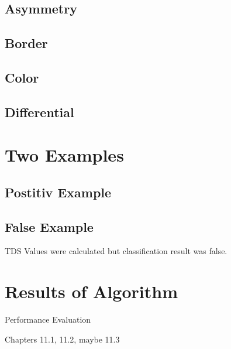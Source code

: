 \subsection{Asymmetry}


\subsection{Border}


\subsection{Color}


\subsection{Differential}

\section{Two Examples}
\subsection{Postitiv Example}

\subsection{False Example}

TDS Values were calculated but classification result was false.

\section{Results of Algorithm}



Performance Evaluation

Chapters 11.1, 11.2, maybe 11.3